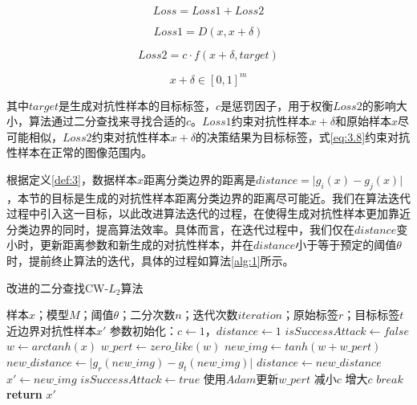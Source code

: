 \begin{equation}
	\label{eq:3.5}
	Loss = Loss1 + Loss2 
\end{equation}

\begin{equation}
	\label{eq:3.6}
	Loss1 = D(x, x + \delta)
\end{equation}

\begin{equation}
	\label{eq:3.7}
	Loss2 = c \cdot f(x + \delta,target)
\end{equation}

\begin{equation}
	\label{eq:3.8}
	x + \delta \in [0,1]^m
\end{equation}

\noindent 其中$target$是生成对抗性样本的目标标签，$c$是惩罚因子，用于权衡$Loss2$的影响大小，算法通过二分查找来寻找合适的$c$。$Loss1$约束对抗性样本$x + \delta$和原始样本$x$尽可能相似，$Loss2$约束对抗性样本$x + \delta$的决策结果为目标标签，式\ref{eq:3.8}约束对抗性样本在正常的图像范围内。

根据定义\ref{def:3}，数据样本$x$距离分类边界的距离是$distance = \vert g_i(x) - g_j(x) \vert$，本节的目标是生成的对抗性样本距离分类边界的距离尽可能近。我们在算法迭代过程中引入这一目标，以此改进算法迭代的过程，在使得生成对抗性样本更加靠近分类边界的同时，提高算法效率。具体而言，在迭代过程中，我们仅在$distance$变小时，更新距离参数和新生成的对抗性样本，并在$distance$小于等于预定的阈值$\theta$时，提前终止算法的迭代，具体的过程如算法\ref{alg:1}所示。

\begin{algorithm}[H] 
	\caption{改进的二分查找CW-$L_2$算法}
	\label{alg:1}
	\begin{algorithmic}[1]
		
		\Require 样本$x$；模型$M$；阈值$\theta$；二分次数$n$；迭代次数$iteration$；原始标签$r$；目标标签$t$
		\Ensure 近边界对抗性样本$x'$
		\State 参数初始化：$c\gets1$，$distance \gets 1$
			\State $isSuccessAttack \gets false$
			\State $w \gets arctanh(x)$
			\State $w\_pert \gets zero\_like(w)$
				\State $new\_img \gets tanh(w + w\_pert)$
				\State $new\_distance \gets \vert g_r(new\_img) - g_t(new\_img) \vert$
					\State $distance \gets new\_distance$
					\State $x' \gets new\_img$
					\State $isSuccessAttack \gets true$
				\EndIf
				\State 使用$Adam$更新$w\_pert$
			\EndFor
			\State 减小$c$
			\Else \State 增大$c$
			\EndIf 
			\State $break$
			\EndIf
		\EndFor
		\State \textbf{return} $x'$
	\end{algorithmic}
\end{algorithm}

